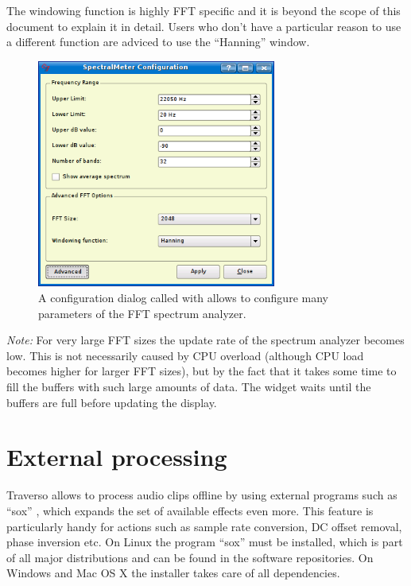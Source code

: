 The windowing function is highly FFT specific and it is beyond the scope of this document to explain it in detail. Users who don't have a particular reason to use a different function are adviced to use the ``Hanning'' window.

\begin{figure}
	\centering
	\includegraphics[width=0.7\textwidth]{images/fft3}
	\caption{A configuration dialog called with  allows to configure many parameters of the FFT spectrum analyzer.}
	\label{fig_fft3}
\end{figure}

\emph{Note:} For very large FFT sizes the update rate of the spectrum analyzer becomes low. This is not necessarily caused by CPU overload (although CPU load becomes higher for larger FFT sizes), but by the fact that it takes some time to fill the buffers with such large amounts of data. The widget waits until the buffers are full before updating the display.

\section{External processing}
Traverso allows to process audio clips offline by using external programs such as ``sox'' \cite{sox}, which expands the set of available effects even more. This feature is particularly handy for actions such as sample rate conversion, DC offset removal, phase inversion etc. On Linux the program ``sox'' must be installed, which is part of all major distributions and can be found in the software repositories. On Windows and Mac OS X the installer takes care of all dependencies.


